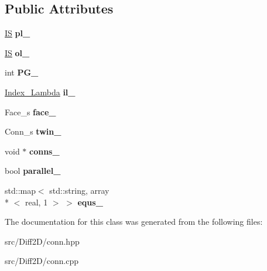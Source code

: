 \subsection*{Public Attributes}
\begin{DoxyCompactItemize}
\item 
\hypertarget{classConn_a61c9d519b93b91a14b4cc47a8cb8980b}{\hyperlink{structIS}{I\-S} {\bfseries pl\-\_\-}}\label{classConn_a61c9d519b93b91a14b4cc47a8cb8980b}

\item 
\hypertarget{classConn_a949773005bd6449b09e355e8f78dee47}{\hyperlink{structIS}{I\-S} {\bfseries ol\-\_\-}}\label{classConn_a949773005bd6449b09e355e8f78dee47}

\item 
\hypertarget{classConn_a8550bde616100c5f9cc23bc7ae267a18}{int {\bfseries P\-G\-\_\-}}\label{classConn_a8550bde616100c5f9cc23bc7ae267a18}

\item 
\hypertarget{classConn_a659caee9d9a125f24d7eb054ca2e5879}{\hyperlink{structIndex__Lambda}{Index\-\_\-\-Lambda} {\bfseries il\-\_\-}}\label{classConn_a659caee9d9a125f24d7eb054ca2e5879}

\item 
\hypertarget{classConn_a893abc608e559f12c5368edbd6da7b54}{Face\-\_\-s {\bfseries face\-\_\-}}\label{classConn_a893abc608e559f12c5368edbd6da7b54}

\item 
\hypertarget{classConn_a7578b2f58e208173f45436d7261271a0}{Conn\-\_\-s {\bfseries twin\-\_\-}}\label{classConn_a7578b2f58e208173f45436d7261271a0}

\item 
\hypertarget{classConn_ac571dea0fa3d37ed022872da32ad6c33}{void $\ast$ {\bfseries conns\-\_\-}}\label{classConn_ac571dea0fa3d37ed022872da32ad6c33}

\item 
\hypertarget{classConn_aae3bc6691f2e065bf44e8f1a2cd4e31f}{bool {\bfseries parallel\-\_\-}}\label{classConn_aae3bc6691f2e065bf44e8f1a2cd4e31f}

\item 
\hypertarget{classConn_a425d7d5713a82acbfa9a69adcc0c1c25}{std\-::map$<$ std\-::string, array\\*
$<$ real, 1 $>$ $>$ {\bfseries equs\-\_\-}}\label{classConn_a425d7d5713a82acbfa9a69adcc0c1c25}

\end{DoxyCompactItemize}


The documentation for this class was generated from the following files\-:\begin{DoxyCompactItemize}
\item 
src/\-Diff2\-D/conn.\-hpp\item 
src/\-Diff2\-D/conn.\-cpp\end{DoxyCompactItemize}
